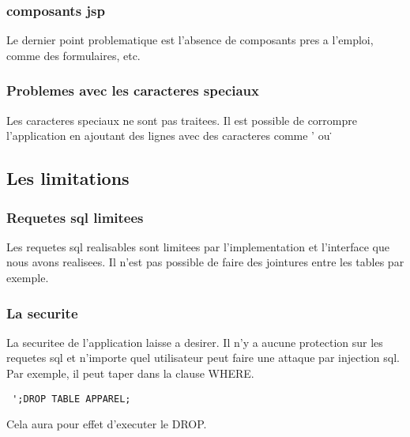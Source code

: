 \subsubsection{composants jsp}
Le dernier point problematique est l'absence de composants pres a l'emploi, comme des formulaires, etc.
\subsubsection{Problemes avec les caracteres speciaux}
Les caracteres speciaux ne sont pas traitees. Il est possible de corrompre l'application en ajoutant des lignes avec des caracteres comme ' ou \.
\subsection{Les limitations}
\subsubsection{Requetes sql limitees}
Les requetes sql realisables sont limitees par l'implementation et l'interface que nous avons realisees. Il n'est pas possible de faire des jointures entre les tables par exemple.
\subsubsection{La securite}
La securitee de l'application laisse a desirer. Il n'y a aucune protection sur les requetes sql et n'importe quel utilisateur peut faire une attaque par injection sql. 
Par exemple, il peut taper dans la clause WHERE.
\begin{verbatim}
 ';DROP TABLE APPAREL;
\end{verbatim}
Cela aura pour effet d'executer le DROP.


